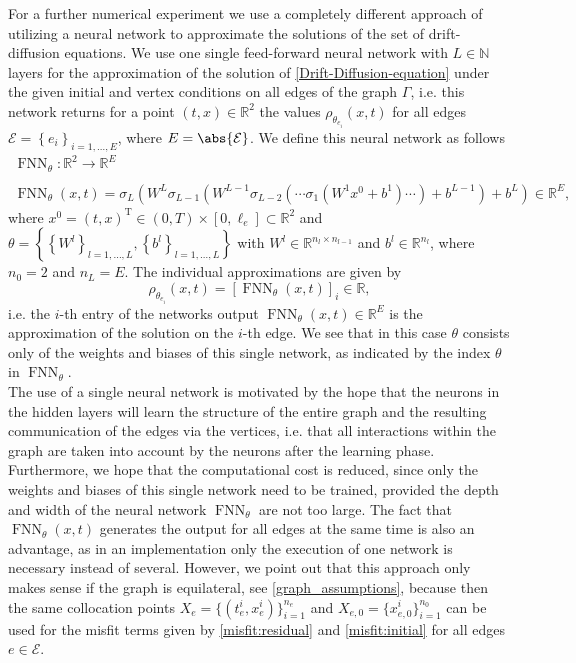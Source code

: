 For a further numerical experiment we use a completely different approach of utilizing a neural network to approximate the solutions of the set of drift-diffusion equations. We use one single feed-forward neural network with $L \in \mathbb{N}$ layers for the approximation of the solution of \cref{Drift-Diffusion-equation} under the given initial and vertex conditions on all edges of the graph $\Gamma$, i.e. this network returns for a point $(t,x) \in \mathbb{R}^2$ the values $\rho_{\theta_{e_i}}(x, t)$ for all edges $\mathcal{E} = \left\{ e_i \right\}_{i = 1, \ldots, E}$, where $E = \abs{\mathcal{E}}$. We define this neural network as follows
\begin{equation} 
    \label{one_for_all}
    \begin{gathered}
        \operatorname{FNN}_{\theta} \colon \mathbb{R}^2 \to \mathbb{R}^E \\
        \\
        \operatorname{FNN}_{\theta}(x, t) = \sigma_L(W^L \sigma_{L-1}(W^{L-1}\sigma_{L-2}(\cdots \sigma_{1}(W^{1}x^0 +b^1) \cdots) + b^{L-1}) + b^{L}) \in \mathbb{R}^E, 
    \end{gathered} 
\end{equation} 
where $x^0 = (t, x)^{\mathrm{T}} \in (0, T) \times [0, \ell_e] \subset \mathbb{R}^2$ and $\theta = \left\{ \left\{ W^l \right\}_{l = 1, \ldots, L}, \left\{ b^l \right\}_{l = 1, \ldots, L} \right\}$ with $W^l \in \mathbb{R}^{n_l \times n_{l-1}}$ and $b^l \in \mathbb{R}^{n_l}$, where $n_0 = 2$ and $n_L = E$. The individual approximations are given by 
\begin{equation*}
    \rho_{\theta_{e_i}}(x, t) = \left[ \operatorname{FNN}_{\theta}(x, t) \right]_i \in \mathbb{R},
\end{equation*}
i.e. the $i$-th entry of the networks output $\operatorname{FNN}_{\theta}(x, t) \in \mathbb{R}^E$ is the approximation of the solution on the $i$-th edge. We see that in this case $\theta$ consists only of the weights and biases of this single network, as indicated by the index $\theta$ in $\operatorname{FNN}_{\theta}$. \\
The use of a single neural network is motivated by the hope that the neurons in the hidden layers will learn the structure of the entire graph and the resulting communication of the edges via the vertices, i.e. that all interactions within the graph are taken into account by the neurons after the learning phase. Furthermore, we hope that the computational cost is reduced, since only the weights and biases of this single network need to be trained, provided the depth and width of the neural network $\operatorname{FNN}_{\theta}$ are not too large. The fact that $\operatorname{FNN}_{\theta}(x, t)$ generates the output for all edges at the same time is also an advantage, as in an implementation only the execution of one network is necessary instead of several. However, we point out that this approach only makes sense if the graph is equilateral, see \cref{graph_assumptions}, because then the same collocation points $X_e = \{ \left( t_e^i, x_e^i \right)\}_{i=1}^{n_e}$ and $X_{e,0} = \{x_{e,0}^i\}_{i=1}^{n_0}$ can be used for the misfit terms given by \cref{misfit:residual} and \cref{misfit:initial} for all edges $e \in \mathcal{E}$. 


